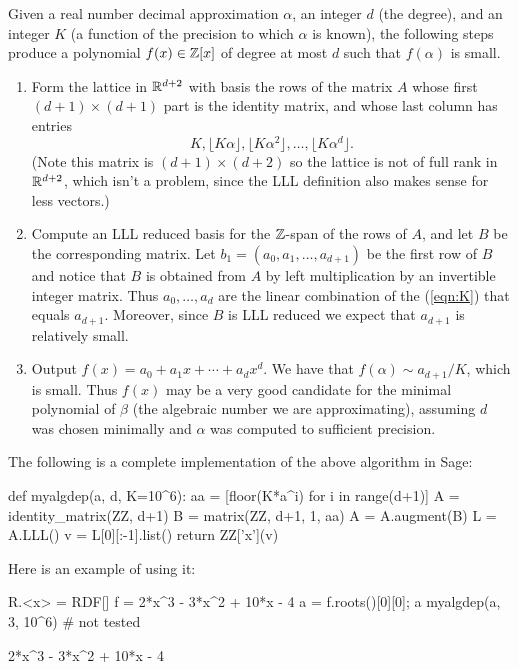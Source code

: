 Given a real number decimal approximation $\alpha$, an
integer $d$ (the degree), and an integer $K$ (a function
of the precision to which $\alpha$ is known), the following
steps produce a polynomial $f(x) \in \mathbb{Z}[x]$ of degree 
at most $d$ such that $f(\alpha)$ is small.  
\begin{enumerate}
\item Form the lattice in $\mathbb{R}^{d+2}$ with basis the rows
of the matrix $A$ whose first $(d+1) \times (d+1)$ part is the
identity matrix, and whose last column has entries
\begin{equation}\label{eqn:K}
K, \lfloor K\alpha \rfloor, \lfloor K\alpha^2 \rfloor, 
\ldots, \lfloor K\alpha^{d} \rfloor.
\end{equation}
(Note this matrix is $(d+1) \times (d+2)$ so the lattice
is not of full rank in $\mathbb{R}^{d+2}$, which isn't a problem,
since the LLL definition also makes sense for less vectors.)
\item Compute an LLL reduced basis for the $\mathbb{Z}$-span of the rows
of $A$, and let $B$ be the corresponding matrix. 
Let $b_1 = (a_0, a_1, \ldots, a_{d+1})$ be the first
row of $B$ and notice that $B$ is obtained from $A$
by left multiplication by an invertible integer matrix.
Thus $a_0,\ldots, a_d$ are the linear combination of the
(\ref{eqn:K}) that equals $a_{d+1}$. Moreover, since $B$
is LLL reduced we expect that $a_{d+1}$ is relatively small. 

\item Output $f(x) = a_0 + a_1 x + \cdots + a_{d} x^d$.
We have that $f(\alpha) \sim a_{d+1}/K$, which is small.
Thus $f(x)$ may be a very good candidate for the minimal
polynomial of $\beta$ (the algebraic number we are approximating),
assuming $d$ was chosen minimally and $\alpha$ was computed
to sufficient precision.
\end{enumerate}

The following is a complete implementation of the above algorithm
in Sage:
\begin{sagecode}
\begin{sagecell}
def myalgdep(a, d, K=10^6):
    aa = [floor(K*a^i) for i in range(d+1)]
    A = identity_matrix(ZZ, d+1)
    B = matrix(ZZ, d+1, 1, aa)
    A = A.augment(B)
    L = A.LLL()
    v = L[0][:-1].list()
    return ZZ['x'](v)
\end{sagecell}
\end{sagecode}

Here is an example of using it:
\begin{sagecode}
\begin{sagecell}
R.<x> = RDF[]
f = 2*x^3 - 3*x^2 + 10*x - 4
a = f.roots()[0][0]; a
myalgdep(a, 3, 10^6)       # not tested
\end{sagecell}
\begin{sageout}
2*x^3 - 3*x^2 + 10*x - 4
\end{sageout}
\end{sagecode}


